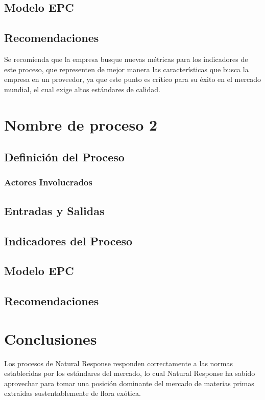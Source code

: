 \documentclass[12pt,letterpaper]{article}
\begin{document}
\subsection{Modelo EPC}

\subsection{Recomendaciones}
Se recomienda que la empresa busque nuevas métricas para los indicadores de este proceso, que representen de mejor manera las características que busca la empresa en un proveedor, ya que este punto es crítico para su éxito en el mercado mundial, el cual exige altos estándares de calidad.

\section{Nombre de proceso 2}

\subsection{Definición del Proceso}

\subsubsection{Actores Involucrados}

\subsection{Entradas y Salidas}

\subsection{Indicadores del Proceso}

\subsection{Modelo EPC}

\subsection{Recomendaciones}

\section{Conclusiones}
Los procesos de Natural Response responden correctamente a las normas establecidas por los estándares del mercado, lo cual Natural Response ha sabido aprovechar para tomar una posición dominante del mercado de materias primas extraidas sustentablemente de flora exótica.\\
\end{document}
